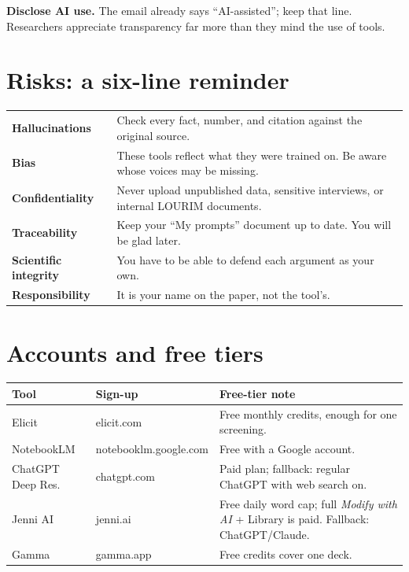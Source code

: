 \documentclass[11pt,a4paper]{article}
\begin{document}
\begin{watchout}
\textbf{Disclose AI use.} The email already says ``AI-assisted''; keep that line. Researchers appreciate transparency far more than they mind the use of tools.
\end{watchout}

\section{Risks: a six-line reminder}
\label{sec:risks}

\begin{center}
\small
\begin{tabularx}{\linewidth}{@{}l X@{}}
\toprule
\textbf{Hallucinations} & Check every fact, number, and citation against the original source. \\
\textbf{Bias} & These tools reflect what they were trained on. Be aware whose voices may be missing. \\
\textbf{Confidentiality} & Never upload unpublished data, sensitive interviews, or internal LOURIM documents. \\
\textbf{Traceability} & Keep your ``My prompts'' document up to date. You will be glad later. \\
\textbf{Scientific integrity} & You have to be able to defend each argument as your own. \\
\textbf{Responsibility} & It is your name on the paper, not the tool's. \\
\bottomrule
\end{tabularx}
\end{center}

\appendix

\section{Accounts and free tiers}
\label{app:accounts}

\begin{center}
\small
\begin{tabularx}{\linewidth}{@{}l l X@{}}
\toprule
\textbf{Tool} & \textbf{Sign-up} & \textbf{Free-tier note} \\
\midrule
Elicit            & elicit.com             & Free monthly credits, enough for one screening. \\
NotebookLM        & notebooklm.google.com  & Free with a Google account. \\
ChatGPT Deep Res. & chatgpt.com            & Paid plan; fallback: regular ChatGPT with web search on. \\
Jenni AI          & jenni.ai               & Free daily word cap; full \emph{Modify with AI} + Library is paid. Fallback: ChatGPT/Claude. \\
Gamma             & gamma.app              & Free credits cover one deck. \\
\bottomrule
\end{tabularx}
\end{center}
\end{document}
